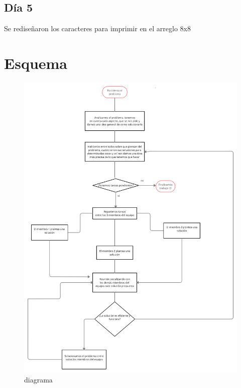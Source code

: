 \documentclass{article}
\begin{document}
\subsection{Día 5}
Se rediseñaron los caracteres para imprimir en el arreglo 8x8


\label{fig:my_label}
\section{Esquema} \label{contenido}
\begin{figure}
    \centering
    \includegraphics[width=16cm]{diagrama.png}
    \caption{diagrama}
    \label{fig:my_label}
\end{figure}


\end{document}
